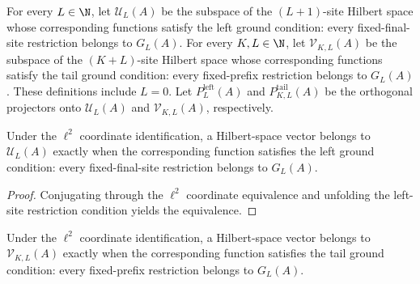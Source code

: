 \begin{definition}
    \label{def:open_chain_ground_subspaces_es}
    \leanok
    For every $L\in\N$, let $\mathcal U_L(A)$ be the subspace of the
    $(L+1)$-site Hilbert space whose corresponding functions satisfy the left
    ground condition: every fixed-final-site restriction belongs to $G_L(A)$.
    For every $K,L\in\N$, let $\mathcal V_{K,L}(A)$ be the subspace of the
    $(K+L)$-site Hilbert space whose corresponding functions satisfy the tail
    ground condition: every fixed-prefix restriction belongs to $G_L(A)$.
    These definitions include $L=0$. Let $P^{\mathrm{left}}_L(A)$ and
    $P^{\mathrm{tail}}_{K,L}(A)$ be the orthogonal projectors onto
    $\mathcal U_L(A)$ and $\mathcal V_{K,L}(A)$, respectively.
\end{definition}

\begin{lemma}
    \label{thm:mem_open_chain_left_ground_space_es}
    \leanok
    Under the $\ell^2$ coordinate identification, a Hilbert-space vector
    belongs to $\mathcal U_L(A)$ exactly when the corresponding function
    satisfies the left ground condition: every fixed-final-site restriction
    belongs to $G_L(A)$.
\end{lemma}

\begin{proof}
    \leanok
    Conjugating through the $\ell^2$ coordinate equivalence and unfolding the
    left-site restriction condition yields the equivalence.
\end{proof}

\begin{lemma}
    \label{thm:mem_open_chain_tail_ground_space_es}
    \leanok
    Under the $\ell^2$ coordinate identification, a Hilbert-space vector
    belongs to $\mathcal V_{K,L}(A)$ exactly when the corresponding function
    satisfies the tail ground condition: every fixed-prefix restriction
    belongs to $G_L(A)$.
\end{lemma}

